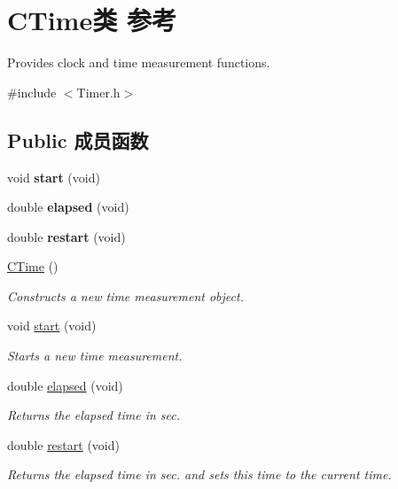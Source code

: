 \hypertarget{class_c_time}{\section{C\+Time类 参考}
\label{class_c_time}
}


Provides clock and time measurement functions.  




{\ttfamily \#include $<$Timer.\+h$>$}

\subsection*{Public 成员函数}
\begin{DoxyCompactItemize}
\item 
\hypertarget{class_c_time_a8214eca7d1860b4ca82c15db55ef6a8e}{void {\bfseries start} (void)}\label{class_c_time_a8214eca7d1860b4ca82c15db55ef6a8e}

\item 
\hypertarget{class_c_time_a75c288cd86139cac8f56997940d3fb38}{double {\bfseries elapsed} (void)}\label{class_c_time_a75c288cd86139cac8f56997940d3fb38}

\item 
\hypertarget{class_c_time_abd2bb1db26aab1405a70426d3a58e3d4}{double {\bfseries restart} (void)}\label{class_c_time_abd2bb1db26aab1405a70426d3a58e3d4}

\item 
\hyperlink{class_c_time_ae54335556cd4f492f308218a80493d3b}{C\+Time} ()
\begin{DoxyCompactList}\small\item\em Constructs a new time measurement object. \end{DoxyCompactList}\item 
void \hyperlink{class_c_time_a8214eca7d1860b4ca82c15db55ef6a8e}{start} (void)
\begin{DoxyCompactList}\small\item\em Starts a new time measurement. \end{DoxyCompactList}\item 
double \hyperlink{class_c_time_a75c288cd86139cac8f56997940d3fb38}{elapsed} (void)
\begin{DoxyCompactList}\small\item\em Returns the elapsed time in sec. \end{DoxyCompactList}\item 
double \hyperlink{class_c_time_abd2bb1db26aab1405a70426d3a58e3d4}{restart} (void)
\begin{DoxyCompactList}\small\item\em Returns the elapsed time in sec. and sets this time to the current time. \end{DoxyCompactList}\end{DoxyCompactItemize}


